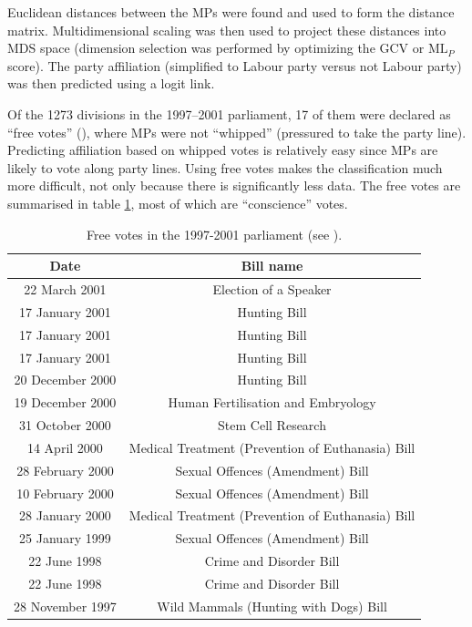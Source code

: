 Euclidean distances between the MPs were found and used to form the distance matrix. Multidimensional scaling was then used to project these distances into MDS space (dimension selection was performed by optimizing the GCV or $\text{ML}_P$ score). The party affiliation (simplified to Labour party versus not Labour party) was then predicted using a logit link.

Of the 1273 divisions in the 1997--2001 parliament, 17 of them were declared  as ``free votes'' (\cite{freevotes}), where MPs were not ``whipped'' (pressured to take the party line). Predicting affiliation based on whipped votes is relatively easy since MPs are likely to vote along party lines. Using free votes makes the classification much more difficult, not only because there is significantly less data. The free votes are summarised in table \ref{free-vote-description}, most of which are ``conscience'' votes.

\begin{table}  
\begin{centering}
\begin{tabular}{cc}
	Date & Bill name \\
    \hline
    \hline
22 March 2001    &   Election of a Speaker \\
17 January 2001  &   Hunting Bill \\
17 January 2001  &   Hunting Bill \\
17 January 2001  &   Hunting Bill\\
20 December 2000 &   Hunting Bill \\
19 December 2000 &   Human Fertilisation and Embryology\\
31 October 2000  &   Stem Cell Research \\
14 April 2000    &   Medical Treatment (Prevention of Euthanasia) Bill \\
28 February 2000 &   Sexual Offences (Amendment) Bill \\
10 February 2000 &   Sexual Offences (Amendment) Bill \\
28 January 2000  &   Medical Treatment (Prevention of Euthanasia) Bill\\
25 January 1999  &   Sexual Offences (Amendment) Bill\\
22 June 1998     &  Crime and Disorder Bill \\
22 June 1998     &  Crime and Disorder Bill \\
28 November 1997 &  Wild Mammals (Hunting with Dogs) Bill\\
  \end{tabular}
\caption{Free votes in the 1997-2001 parliament (see \cite{freevotes}).}
\end{centering}
\label{free-vote-description}
\end{table}

